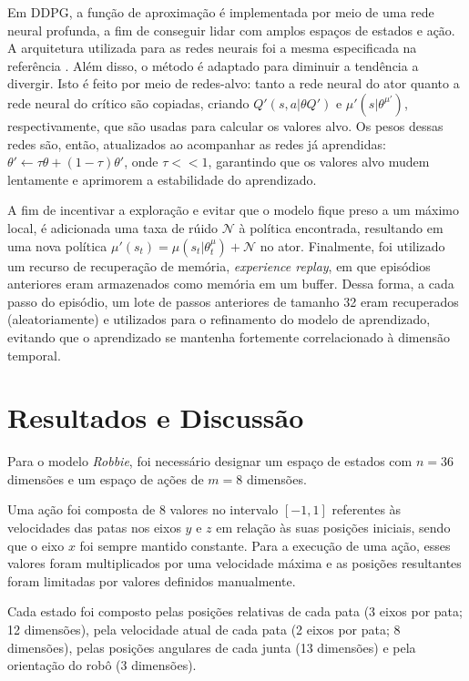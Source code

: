 \documentclass[twoside,conference,a4paper]{IEEEtran}
\begin{document}
Em DDPG, a função de aproximação é implementada por meio de uma rede neural profunda, a fim de conseguir lidar com amplos espaços de estados e ação. A arquitetura utilizada para as redes neurais foi a mesma especificada na referência \cite{Lillicrap:2016}. Além disso, o método é adaptado para diminuir a tendência a divergir. Isto é feito por meio de redes-alvo: tanto a rede neural do ator quanto a rede neural do crítico são copiadas, criando $Q'(s,a|\theta{Q'})$ e $\mu'(s|\theta^{\mu'})$, respectivamente, que são usadas para calcular os valores alvo. Os pesos dessas redes são, então, atualizados ao acompanhar as redes já aprendidas: $\theta' \leftarrow \tau \theta  + (1 - \tau)\theta'$, onde $\tau << 1$, garantindo que os valores alvo mudem lentamente e aprimorem a estabilidade do aprendizado.

A fim de incentivar a exploração e evitar que o modelo fique preso a um máximo local, é adicionada uma taxa de rúido $\mathcal{N}$ à política encontrada, resultando em uma nova política $\mu'(s_t) = \mu(s_t|\theta_t^{\mu}) + \mathcal{N}$ no ator. Finalmente, foi utilizado um recurso de recuperação de memória, \textit{experience replay}, em que episódios anteriores eram armazenados como memória em um buffer. Dessa forma, a cada passo do episódio, um lote de passos anteriores de tamanho 32 eram recuperados (aleatoriamente) e utilizados para o refinamento do modelo de aprendizado, evitando que o aprendizado se mantenha fortemente correlacionado à dimensão temporal.

\section{Resultados e Discussão}\label{sec-res}

Para o modelo \textit{Robbie}, foi necessário designar um espaço de estados com $n = 36$ dimensões e um espaço de ações de $m = 8$ dimensões.

Uma ação foi composta de 8 valores no intervalo $[-1,1]$ referentes às velocidades das patas nos eixos $y$ e $z$ em relação às suas posições iniciais, sendo que o eixo $x$ foi sempre mantido constante. Para a execução de uma ação, esses valores foram multiplicados por uma velocidade máxima e as posições resultantes foram limitadas por valores definidos manualmente.

Cada estado foi composto pelas posições relativas de cada pata (3 eixos por pata; 12 dimensões), pela velocidade atual de cada pata (2 eixos por pata; 8 dimensões), pelas posições angulares de cada junta (13 dimensões) e pela orientação do robô (3 dimensões).
\end{document}
